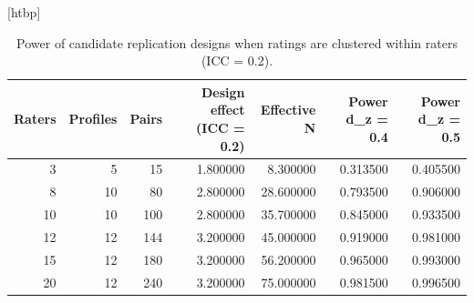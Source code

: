 \begin{table}
\small[htbp]
\caption{Power of candidate replication designs when ratings are clustered within raters (ICC = 0.2).}
\label{tab:S16_power_designs}
\begin{tabular}{rrrrrrr}
\toprule
Raters & Profiles & Pairs & Design effect (ICC = 0.2) & Effective N & Power d\_z = 0.4 & Power d\_z = 0.5 \\
\midrule
3 & 5 & 15 & 1.800000 & 8.300000 & 0.313500 & 0.405500 \\
8 & 10 & 80 & 2.800000 & 28.600000 & 0.793500 & 0.906000 \\
10 & 10 & 100 & 2.800000 & 35.700000 & 0.845000 & 0.933500 \\
12 & 12 & 144 & 3.200000 & 45.000000 & 0.919000 & 0.981000 \\
15 & 12 & 180 & 3.200000 & 56.200000 & 0.965000 & 0.993000 \\
20 & 12 & 240 & 3.200000 & 75.000000 & 0.981500 & 0.996500 \\
\bottomrule
\end{tabular}
\end{table}
